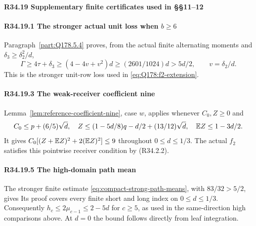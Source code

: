 \paragraph{R34.19 Supplementary finite certificates used in §§11--12}

\paragraph{R34.19.1 The stronger actual unit loss when \(b\ge 6\)}
Paragraph~\ref{part:Q178.5.4} proves, from the actual finite
alternating moments and \(\delta_3\ge\delta_2^2/d\),
\[
 \Gamma\ge4\tau+\delta_3\ge(4-4v+v^2)d
 \ge(2601/1024)d>5d/2,\qquad v=\delta_2/d.
\]
This is the stronger unit-row loss used in
\eqref{eq:Q178:f2-extension}.

\paragraph{R34.19.3 The weak-receiver coefficient nine}
Lemma~\ref{lem:reference-coefficient-nine}, case \(w\), applies whenever
\(C_0,Z\ge0\) and
\[
 C_0\le p+(6/5)\sqrt d,\quad
 Z\le(1-5d/8)q-d/2+(13/12)\sqrt d,\quad
 \mathbb E Z\le1-3d/2.
\]
It gives \(C_0[(Z+\mathbb E Z)^2+2(\mathbb E Z)^2]\le9\) throughout
\(0\le d\le1/3\). The actual \(f_2\) satisfies this pointwise
receiver condition by (R34.2.2).

\paragraph{R34.19.5 The high-domain path mean}
The stronger finite estimate \eqref{eq:compact-strong-path-means},
with \(83/32>5/2\), gives
Its proof covers every finite short and long index on \(0\le d\le1/3\).
Consequently \(h_c\le2\mu_{c-1}\le2-5d\) for \(c\ge5\),
as used in the same-direction high comparisons above. At \(d=0\)
the bound follows directly from leaf integration.
